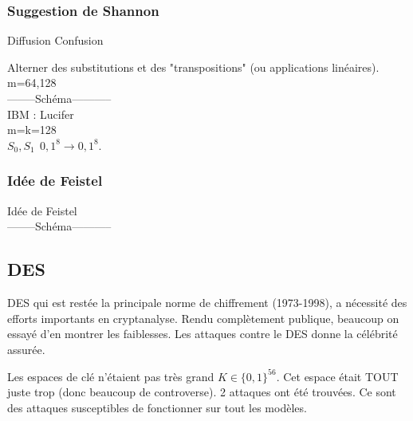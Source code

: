 \documentclass[12pt,a4paper]{article}
\begin{document}
\subsubsection{Suggestion de Shannon}
\begin{center}
Diffusion \hspace*{5cm} Confusion\\
\end{center}

Alterner des substitutions et des "transpositions" (ou applications linéaires).\\

m=64,128\\
--------Schéma-----------\\

IBM : Lucifer \\
m=k=128\\
$S_0, S_1 \ \ {0,1}^8 \longrightarrow {0,1}^8$.\\

\subsubsection{Idée de Feistel}

Idée de Feistel\\
--------Schéma-----------\\


\subsection{DES}

DES qui est restée la principale norme de chiffrement (1973-1998), a nécessité des efforts importants en cryptanalyse. Rendu complètement publique, beaucoup on essayé d'en montrer les faiblesses. Les attaques contre le DES donne la célébrité assurée.

Les espaces de clé n'étaient pas très grand $K \in \{0,1\}^{56}$. Cet espace était TOUT juste trop (donc beaucoup de controverse). 2 attaques ont été trouvées. Ce sont des attaques susceptibles de fonctionner sur tout les modèles.\\
\end{document}
